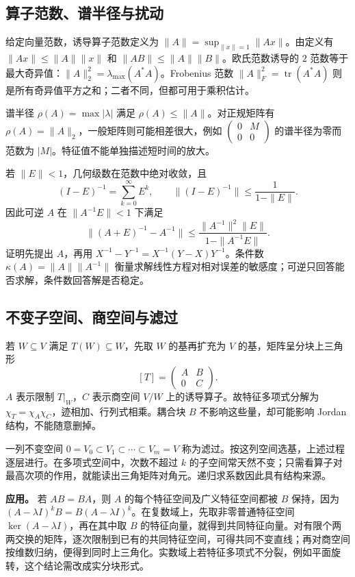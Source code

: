 \documentclass[UTF8,12pt,a4paper,fontset=fandol]{ctexart}
\begin{document}
\subsection{算子范数、谱半径与扰动}

\label{app:linear-norm}

给定向量范数，诱导算子范数定义为 $\|A\|=\sup_{\|x\|=1}\|Ax\|$。由定义有 $\|Ax\|\leq\|A\|\|x\|$ 和 $\|AB\|\leq\|A\|\|B\|$。欧氏范数诱导的 $2$ 范数等于最大奇异值：$\|A\|_2^2=\lambda_{\max}(A^*A)$。Frobenius 范数 $\|A\|_F^2=\operatorname{tr}(A^*A)$ 则是所有奇异值平方之和；二者不同，但都可用于乘积估计。

谱半径 $\rho(A)=\max|\lambda|$ 满足 $\rho(A)\leq\|A\|$。对正规矩阵有 $\rho(A)=\|A\|_2$，一般矩阵则可能相差很大，例如 $\begin{pmatrix}0&M\\0&0\end{pmatrix}$ 的谱半径为零而范数为 $|M|$。特征值不能单独描述短时间的放大。

若 $\|E\|<1$，几何级数在范数中绝对收敛，且
\[
(I-E)^{-1}=\sum_{k=0}^\infty E^k,
\qquad\|(I-E)^{-1}\|\leq\frac1{1-\|E\|}.
\]
因此可逆 $A$ 在 $\|A^{-1}E\|<1$ 下满足
\[
\|(A+E)^{-1}-A^{-1}\|
\leq\frac{\|A^{-1}\|^2\|E\|}{1-\|A^{-1}E\|}.
\]
证明先提出 $A$，再用 $X^{-1}-Y^{-1}=X^{-1}(Y-X)Y^{-1}$。条件数 $\kappa(A)=\|A\|\|A^{-1}\|$ 衡量求解线性方程对相对误差的敏感度；可逆只回答能否求解，条件数回答解是否稳定。

\subsection{不变子空间、商空间与滤过}

\label{app:linear-invariant}

若 $W\subseteq V$ 满足 $T(W)\subseteq W$，先取 $W$ 的基再扩充为 $V$ 的基，矩阵呈分块上三角形
\[
[T]=\begin{pmatrix}A&B\\0&C\end{pmatrix}.
\]
$A$ 表示限制 $T|_W$，$C$ 表示商空间 $V/W$ 上的诱导算子。故特征多项式分解为 $\chi_T=\chi_A\chi_C$，迹相加、行列式相乘。耦合块 $B$ 不影响这些量，却可能影响 Jordan 结构，不能随意删掉。

一列不变空间 $0=V_0\subset V_1\subset\cdots\subset V_m=V$ 称为滤过。按这列空间选基，上述过程逐层进行。在多项式空间中，次数不超过 $k$ 的子空间常天然不变；只需看算子对最高次项的作用，就能读出三角矩阵对角元。递归求系数因此具有结构来源。

\textbf{应用。} 若 $AB=BA$，则 $A$ 的每个特征空间及广义特征空间都被 $B$ 保持，因为 $(A-\lambda I)^kB=B(A-\lambda I)^k$。在复数域上，先取非零普通特征空间 $\ker(A-\lambda I)$，再在其中取 $B$ 的特征向量，就得到共同特征向量。对有限个两两交换的矩阵，逐次限制到已有的共同特征空间，可得共同不变直线；再对商空间按维数归纳，便得到同时上三角化。实数域上若特征多项式不分裂，例如平面旋转，这个结论需改成实分块形式。
\end{document}
